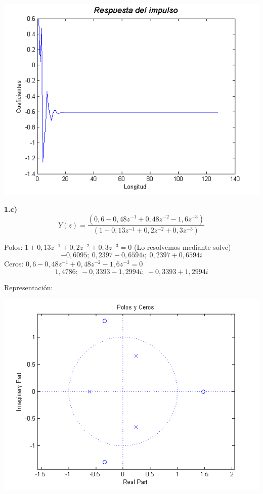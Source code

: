 \documentclass[a4paper,12pt]{article}
\begin{document}
\begin{center}
\includegraphics[width=.8 \textwidth]{ejercicio-4-1-b.png}
\end{center}

\textbf{1.c)} \\

$$ Y(z) = \frac{(0,6 - 0,48 z^{-1} + 0,48 z^{-2} - 1,6 z^{-3})}{(1 + 0,13 z^{-1} + 0,2 z^{-2} + 0,3 z^{-3})}$$

Polos: $ 1 + 0,13 z^{-1} + 0,2 z^{-2} + 0,3 z^{-3} = 0 $ (Lo resolvemos mediante solve) \\
$$ -0,6095;\ 0,2397 - 0,6594i;\ 0,2397 + 0,6594i $$
Ceros: $ 0,6 - 0,48 z^{-1} + 0,48 z^{-2} -1,6 z^{-3} = 0 $ \\
$$ 1,4786;\ -0,3393 - 1,2994i;\ -0,3393 + 1,2994i $$



Representación: \\

\begin{center}
\includegraphics[width=.8 \textwidth]{ejercicio-4-1-c.png}
\end{center}
\end{document}

